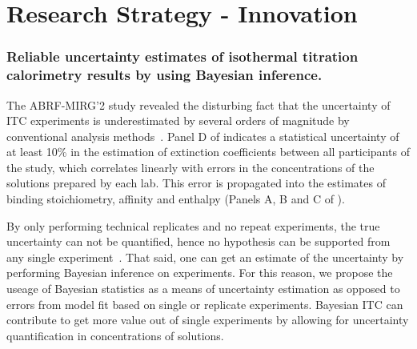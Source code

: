 \documentclass[10pt,final]{article}
\newif\ifinstr
\newcommand{\instr}[1]{\ifdraft{\ifinstr {\color{cyan}\emph{#1}} \fi}{}}
\begin{document}
\section*{Research Strategy - Innovation}
\instr{Explain how your proposal differs from what others have tried.}
\subsubsection*{Reliable uncertainty estimates of isothermal titration calorimetry results by using Bayesian inference.}
The ABRF-MIRG'2 study revealed the disturbing fact that the uncertainty of ITC experiments is underestimated by several orders of magnitude by conventional analysis methods~\autocite{Myszka2003a}. Panel D of  indicates a statistical uncertainty of at least 10\% in the estimation of extinction coefficients between all participants of the study, which correlates linearly with errors in the concentrations of the solutions prepared by each lab. This error is propagated into the estimates of binding stoichiometry, affinity and enthalpy  (Panels A, B and C of ).

By only performing technical replicates  and no repeat experiments, the true uncertainty can not be quantified, hence no hypothesis can be supported from any single experiment~\autocite{Vaux2012a}. That said, one can get an estimate of the uncertainty by performing Bayesian inference on experiments. For this reason, we propose the useage of Bayesian statistics as a means of uncertainty estimation as opposed to errors from model fit based on single or replicate experiments. Bayesian ITC can contribute to get more value out of single experiments by allowing for uncertainty quantification in concentrations of solutions. 
\end{document}

